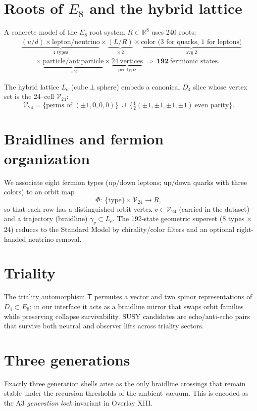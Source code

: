 \section*{Roots of $E_8$ and the hybrid lattice}
A concrete model of the $E_8$ root system $R\subset\mathbb R^8$ uses 240 roots:
\begin{align}
&\underbrace{(u/d)\times\text{lepton/neutrino}}_{\text{4 types}}
\times \underbrace{(L/R)}_{\times\,2}
\times \underbrace{\text{color (3 for quarks, 1 for leptons)}}_{\text{avg }2}
\\[-2pt]
&\qquad\times \underbrace{\text{particle/antiparticle}}_{\times\,2}
\times \underbrace{24\ \text{vertices}}_{\text{per type}}
\ \Longrightarrow\ \mathbf{192}\ \text{fermionic states}.
\end{align}

The hybrid lattice $L_e$ (cube$\perp$sphere) embeds a canonical $D_4$ slice whose vertex set is the 24–cell $\mathcal V_{24}$:
\[
\mathcal V_{24}=\Big\{\text{perms of }(\pm1,0,0,0)\Big\}\ \cup\
\Big\{\tfrac12(\pm1,\pm1,\pm1,\pm1)\ \text{even parity}\Big\}.
\]

\section*{Braidlines and fermion organization}
We associate eight fermion types (up/down leptons; up/down quarks with three colors) to an orbit map
\[
\Phi:\ \{\text{type}\}\times \mathcal V_{24}\longrightarrow R,
\]
so that each row has a distinguished orbit vertex $v\in\mathcal V_{24}$ (carried in the dataset) and a trajectory (braidline) $\gamma_v\subset L_e$. The 192-state geometric superset (8 types $\times$ 24) reduces to the Standard Model by chirality/color filters and an optional right-handed neutrino removal.

\section*{Triality}
The triality automorphism $\mathsf T$ permutes a vector and two spinor representations of $D_4\subset E_8$; in our interface it acts as a braidline mirror that swaps orbit families while preserving collapse survivability. SUSY candidates are echo/anti-echo pairs that survive both neutral and observer lifts across triality sectors.

\section*{Three generations}
Exactly three generation shells arise as the only braidline crossings that remain stable under the recursion thresholds of the ambient vacuum. This is encoded as the A3 \emph{generation lock} invariant in Overlay XIII.

